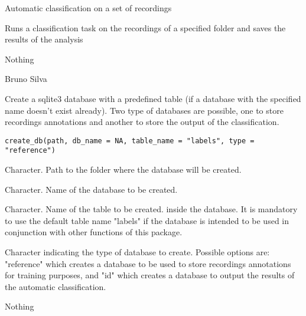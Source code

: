 \documentclass[letterpaper]{book}
\begin{document}
%
\begin{Details}\relax
Automatic classification on a set of recordings

Runs a classification task on the recordings of a specified folder
and saves the results of the analysis
\end{Details}
%
\begin{Value}
Nothing
\end{Value}
%
\begin{Author}\relax
Bruno Silva
\end{Author}
%
\begin{Description}\relax
Create a sqlite3 database with a predefined table (if a
database with the specified name doesn't exist already). Two type of
databases are possible, one to store recordings annotations and another
to store the output of the classification.
\end{Description}
%
\begin{Usage}
\begin{verbatim}
create_db(path, db_name = NA, table_name = "labels", type = "reference")
\end{verbatim}
\end{Usage}
%
\begin{Arguments}
\begin{ldescription}
\item[\code{path}] Character. Path to the folder where the database will be created.

\item[\code{db\_name}] Character. Name of the database to be created.

\item[\code{table\_name}] Character. Name of the table to be created.
inside the database. It is mandatory to use the default table name "labels"
if the database is intended to be used in conjunction with other
functions of this package.

\item[\code{type}] Character indicating the type of database to create. Possible
options are: "reference" which creates a database to be used to store
recordings annotations for training purposes, and "id" which
creates a database to output the results of the automatic classification.
\end{ldescription}
\end{Arguments}
%
\begin{Value}
Nothing
\end{Value}
\end{document}
